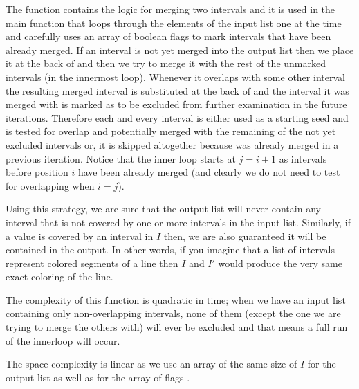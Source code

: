 The function  contains the logic for merging two intervals and it is used in the main function  that loops through the elements of the input list one at the time and carefully uses an array of boolean flags  to mark intervals that have been already merged.
If an interval is not yet merged into the output list  then we place it at the back of  and then we try to merge it with the rest of the unmarked intervals (in the innermost loop).
Whenever it overlaps with some other interval the resulting merged interval is substituted at the back of  and the interval it was merged with is marked as to be excluded from further examination in the future iterations.
Therefore each and every interval is either used as a starting seed and is tested for overlap and potentially merged with the remaining of the not yet excluded intervals or, it is skipped altogether because was already merged in a previous iteration.
Notice that the inner loop starts at $j=i+1$ as intervals before position $i$ have been already merged (and clearly we do not need to test for overlapping when $i=j$).

Using this strategy, we are sure that the output list will never contain any interval that is not covered by one or more intervals in the input list. 
Similarly, if a value is covered by an interval in $I$ then, we are also guaranteed it will be contained in the output.
In other words, if you imagine that a list of intervals represent colored segments of a line then $I$ and $I'$ would produce the very same exact coloring of the line.

The complexity of this function is quadratic in time; when we have an input list containing only non-overlapping intervals, none of them (except the one we are trying to merge the others with) will ever be excluded and that means a full run of the innerloop will occur.

The space complexity is linear as we use an array of the same size of $I$ for the output list as well as for the array of flags . 

